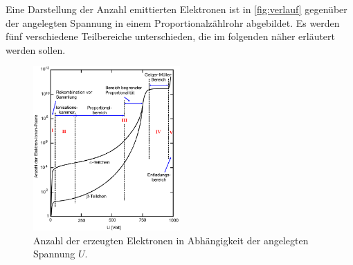 Eine Darstellung der Anzahl emittierten Elektronen ist in \autoref{fig:verlauf} gegenüber der angelegten Spannung in einem Proportionalzählrohr abgebildet.
Es werden fünf verschiedene Teilbereiche unterschieden, die im folgenden näher erläutert werden sollen.
\begin{figure}[H]
    \centering
    \includegraphics[width=0.5\textwidth]{data/verlauf.png}
    \caption{Anzahl der erzeugten Elektronen in Abhängigkeit der angelegten Spannung $U$.}
    \label{fig:verlauf}
\end{figure}



